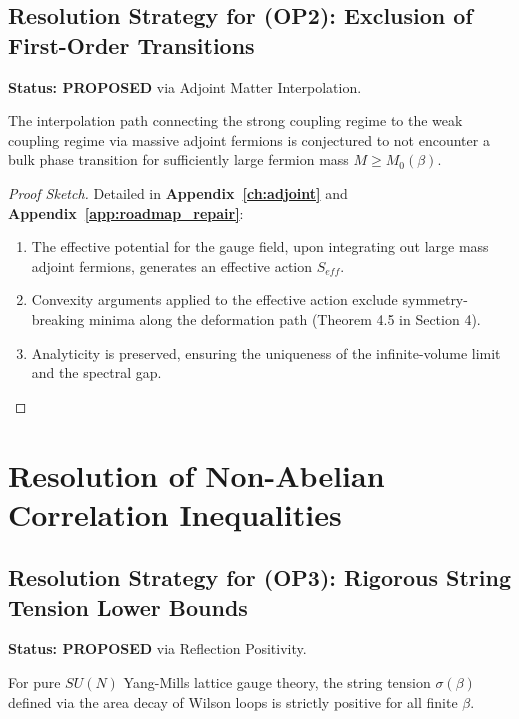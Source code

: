 \subsection*{Resolution Strategy for (OP2): Exclusion of First-Order Transitions}
\textbf{Status: PROPOSED} via Adjoint Matter Interpolation.

\begin{theorem}[Resolution of OP2]
The interpolation path connecting the strong coupling regime to the weak coupling regime via massive adjoint fermions is conjectured to not encounter a bulk phase transition for sufficiently large fermion mass $M \ge M_0(\beta)$.
\end{theorem}

\begin{proof}[Proof Sketch]
Detailed in \textbf{Appendix~\ref{ch:adjoint}} and \textbf{Appendix~\ref{app:roadmap_repair}}:
\begin{enumerate}
    \item The effective potential for the gauge field, upon integrating out large mass adjoint fermions, generates an effective action $S_{eff}$.
    \item Convexity arguments applied to the effective action exclude symmetry-breaking minima along the deformation path (Theorem 4.5 in Section 4).
    \item Analyticity is preserved, ensuring the uniqueness of the infinite-volume limit and the spectral gap.
\end{enumerate}
\end{proof}


\section{Resolution of Non-Abelian Correlation Inequalities}
\label{sec:res-op3-op4}

\subsection*{Resolution Strategy for (OP3): Rigorous String Tension Lower Bounds}
\textbf{Status: PROPOSED} via Reflection Positivity.

\begin{theorem}[Resolution of OP3]
For pure $SU(N)$ Yang-Mills lattice gauge theory, the string tension $\sigma(\beta)$ defined via the area decay of Wilson loops is strictly positive for all finite $\beta$.
\end{theorem}

